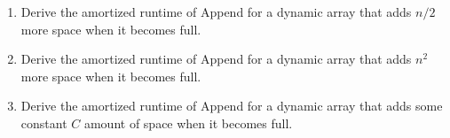 \documentclass[12pt]{article}
\begin{document}
\begin{enumerate}
\begin{enumerate}
    \item Derive the amortized runtime of Append for a dynamic array that adds 
        $n/2$ more space when it becomes full.
    \pagebreak	
    \item Derive the amortized runtime of Append for a dynamic array that adds
        $n^2$ more space when it becomes full. 
    \pagebreak	
    \item Derive the amortized runtime of Append for a dynamic array that adds
        some constant $C$ amount of space when it becomes full.
    \pagebreak	
\end{enumerate}

\end{enumerate}
\end{document}
